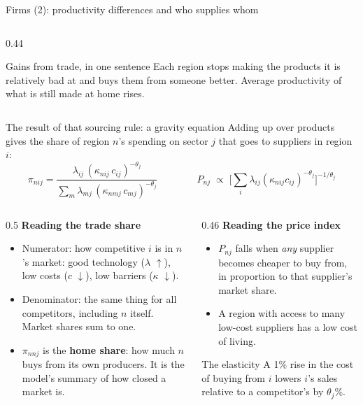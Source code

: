 \documentclass[aspectratio=169,9pt,t]{beamer}
\newcommand{\key}[1]{\textbf{\color{ipnavy}#1}}
\newcommand{\up}{{\color{ipgreen}$\uparrow$}}
\newcommand{\dn}{{\color{ipred}$\downarrow$}}
\begin{document}
\begin{frame}{Firms (2): productivity differences and who supplies whom}
\begin{columns}[T]
\begin{column}{0.44\textwidth}
      \smallskip
      \begin{block}{Gains from trade, in one sentence}
        \small Each region stops making the products it is relatively bad
        at and buys them from someone better. Average productivity of what
        is still made at home rises.
      \end{block}
    \end{column}
  \end{columns}
\end{frame}

\begin{frame}{The result of that sourcing rule: a gravity equation}
  Adding up over products gives the share of region $n$'s spending on
  sector $j$ that goes to suppliers in region $i$:
  \[
    \pi_{nij}=\frac{\lambda_{ij}\,(\kappa_{nij}\,c_{ij})^{-\theta_j}}
                   {\sum_{m}\lambda_{mj}\,(\kappa_{nmj}\,c_{mj})^{-\theta_j}}
    \qquad\qquad
    P_{nj}\;\propto\;\Big[\sum_i \lambda_{ij}(\kappa_{nij}c_{ij})^{-\theta_j}\Big]^{-1/\theta_j}
  \]
  \begin{columns}[T]
    \begin{column}{0.5\textwidth}
      \textbf{Reading the trade share}
      \begin{itemize}
        \item Numerator: how competitive $i$ is in $n$'s market: good
              technology ($\lambda$ \up), low costs ($c$ \dn), low barriers
              ($\kappa$ \dn).
        \item Denominator: the same thing for all competitors, including
              $n$ itself. Market shares sum to one.
        \item $\pi_{nnj}$ is the \key{home share}: how much $n$ buys from
              its own producers. It is the model's summary of how closed
              a market is.
      \end{itemize}
    \end{column}
    \begin{column}{0.46\textwidth}
      \textbf{Reading the price index}
      \begin{itemize}
        \item $P_{nj}$ falls when \emph{any} supplier becomes cheaper to
              buy from, in proportion to that supplier's market share.
        \item A region with access to many low-cost suppliers has a low
              cost of living.
      \end{itemize}
      \begin{block}{The elasticity}
        \small A 1\% rise in the cost of buying from $i$ lowers $i$'s sales
        relative to a competitor's by $\theta_j$\%.
      \end{block}
    \end{column}
  \end{columns}
\end{frame}
\end{document}
